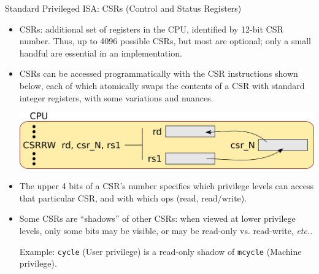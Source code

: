 \documentclass{article}
\newcommand{\hm}{\hspace*{1em}}
\newcommand{\hmmmm}{\hspace*{4em}}
\newcommand{\etc}{\emph{etc.}}
\begin{document}
\clearpage


\begin{center}
  {\Huge
    Standard Privileged ISA: CSRs (Control and Status Registers)}

  \vspace*{0.2in}

  \begin{minipage}{9.5in}\Large
    \begin{itemize}

      \item CSRs: additional set of registers in the CPU, identified
        by 12-bit CSR number.  Thus, up to 4096 possible CSRs, but
        most are optional; only a small handful are essential in an
        implementation.

      \item CSRs can be accessed programmatically with the CSR
        instructions shown below, each of which atomically swaps the
        contents of a CSR with standard integer registers, with some
        variations and nuances.

        \hmmmm {}

        \hm

        \hmmmm \includegraphics[width=6in]{Figs/CSRRW.png}

        \hm

      \item The upper 4 bits of a CSR's number specifies which privilege
        levels can access that particular CSR, and with which
        ops (read, read/write).

      \item Some CSRs are ``shadows'' of other CSRs: when viewed at
        lower privilege levels, only some bits may be visible, or may
        be read-only vs. read-write, {\etc}.

        Example: {\tt cycle} (User privilege) is a read-only shadow of
        {\tt mcycle} (Machine privilege).
    \end{itemize}
  \end{minipage}
\end{center}
\end{document}
